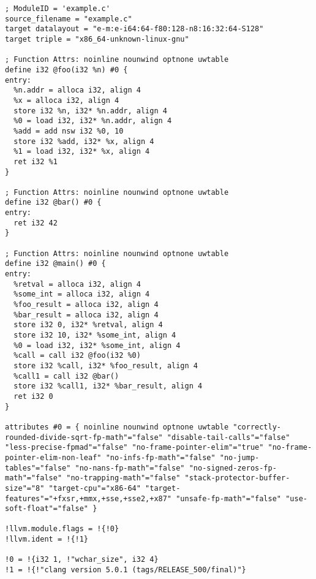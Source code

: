 \documentclass[12pt, twoside]{fithesis2}
\renewcommand{\_}{\leavevmode \kern0.07em\vbox{\hrule width0.4em}}
\begin{document}
\begin{verbatim}
; ModuleID = 'example.c'
source_filename = "example.c"
target datalayout = "e-m:e-i64:64-f80:128-n8:16:32:64-S128"
target triple = "x86_64-unknown-linux-gnu"

; Function Attrs: noinline nounwind optnone uwtable
define i32 @foo(i32 %n) #0 {
entry:
  %n.addr = alloca i32, align 4
  %x = alloca i32, align 4
  store i32 %n, i32* %n.addr, align 4
  %0 = load i32, i32* %n.addr, align 4
  %add = add nsw i32 %0, 10
  store i32 %add, i32* %x, align 4
  %1 = load i32, i32* %x, align 4
  ret i32 %1
}

; Function Attrs: noinline nounwind optnone uwtable
define i32 @bar() #0 {
entry:
  ret i32 42
}

; Function Attrs: noinline nounwind optnone uwtable
define i32 @main() #0 {
entry:
  %retval = alloca i32, align 4
  %some_int = alloca i32, align 4
  %foo_result = alloca i32, align 4
  %bar_result = alloca i32, align 4
  store i32 0, i32* %retval, align 4
  store i32 10, i32* %some_int, align 4
  %0 = load i32, i32* %some_int, align 4
  %call = call i32 @foo(i32 %0)
  store i32 %call, i32* %foo_result, align 4
  %call1 = call i32 @bar()
  store i32 %call1, i32* %bar_result, align 4
  ret i32 0
}

attributes #0 = { noinline nounwind optnone uwtable "correctly-rounded-divide-sqrt-fp-math"="false" "disable-tail-calls"="false" "less-precise-fpmad"="false" "no-frame-pointer-elim"="true" "no-frame-pointer-elim-non-leaf" "no-infs-fp-math"="false" "no-jump-tables"="false" "no-nans-fp-math"="false" "no-signed-zeros-fp-math"="false" "no-trapping-math"="false" "stack-protector-buffer-size"="8" "target-cpu"="x86-64" "target-features"="+fxsr,+mmx,+sse,+sse2,+x87" "unsafe-fp-math"="false" "use-soft-float"="false" }

!llvm.module.flags = !{!0}
!llvm.ident = !{!1}

!0 = !{i32 1, !"wchar_size", i32 4}
!1 = !{!"clang version 5.0.1 (tags/RELEASE_500/final)"}
\end{verbatim}
\end{document}
